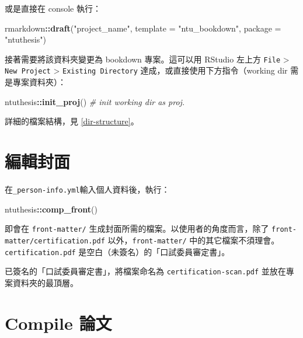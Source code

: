 \documentclass[oneside]{book}
\newenvironment{Shaded}{\begin{snugshade}}{\end{snugshade}}
\newcommand{\KeywordTok}[1]{\textcolor[rgb]{0.13,0.29,0.53}{\textbf{#1}}}
\newcommand{\DataTypeTok}[1]{\textcolor[rgb]{0.13,0.29,0.53}{#1}}
\newcommand{\StringTok}[1]{\textcolor[rgb]{0.31,0.60,0.02}{#1}}
\newcommand{\CommentTok}[1]{\textcolor[rgb]{0.56,0.35,0.01}{\textit{#1}}}
\newcommand{\OperatorTok}[1]{\textcolor[rgb]{0.81,0.36,0.00}{\textbf{#1}}}
\newcommand{\NormalTok}[1]{#1}
\theoremstyle{definition}
\theoremstyle{definition}
\theoremstyle{definition}
\theoremstyle{remark}
\begin{document}
或是直接在 console 執行：

\begin{Shaded}
\begin{Highlighting}[]
\NormalTok{rmarkdown}\OperatorTok{::}\KeywordTok{draft}\NormalTok{(}\StringTok{"project_name"}\NormalTok{,}
                 \DataTypeTok{template =} \StringTok{"ntu_bookdown"}\NormalTok{,}
                 \DataTypeTok{package =} \StringTok{"ntuthesis"}\NormalTok{)}
\end{Highlighting}
\end{Shaded}

接著需要將該資料夾變更為 bookdown 專案。這可以用 RStudio 左上方
\texttt{File} \textgreater{} \texttt{New\ Project} \textgreater{}
\texttt{Existing\ Directory} 達成，或直接使用下方指令（working dir
需是專案資料夾）：

\begin{Shaded}
\begin{Highlighting}[]
\NormalTok{ntuthesis}\OperatorTok{::}\KeywordTok{init_proj}\NormalTok{()  }\CommentTok{# init working dir as proj.}
\end{Highlighting}
\end{Shaded}

詳細的檔案結構，見 \ref{dir-structure}。

\section{編輯封面}\label{edit-front-matter}

在\texttt{\_person-info.yml}輸入個人資料後，執行：

\begin{Shaded}
\begin{Highlighting}[]
\NormalTok{ntuthesis}\OperatorTok{::}\KeywordTok{comp_front}\NormalTok{()}
\end{Highlighting}
\end{Shaded}

即會在 \texttt{front-matter/}
生成封面所需的檔案。以使用者的角度而言，除了
\texttt{front-matter/certification.pdf} 以外，\texttt{front-matter/}
中的其它檔案不須理會。\texttt{certification.pdf}
是空白（未簽名）的「口試委員審定書」。

已簽名的「口試委員審定書」，將檔案命名為 \texttt{certification-scan.pdf}
並放在專案資料夾的最頂層。

\section{Compile 論文}\label{compile-thesis}
\end{document}
